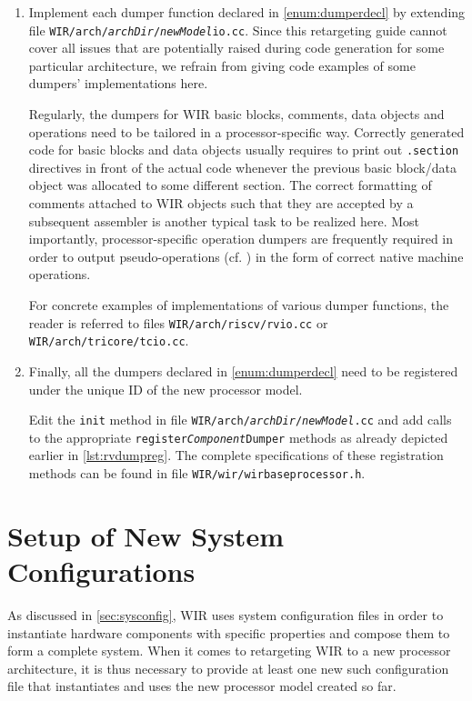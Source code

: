 \begin{enumerate}[resume]
  \item Implement each dumper function declared in \cref{enum:dumperdecl} by extending file \texttt{WIR/arch/{\itshape archDir}/{\itshape newModel}\-io.cc}.
  Since this retargeting guide cannot cover all issues that are potentially raised during code generation for some particular architecture, we refrain from giving code examples of some dumpers' implementations here.

  Regularly, the dumpers for \gls{WIR} basic blocks, comments, data objects and operations need to be tailored in a processor-specific way.
  Correctly generated code for basic blocks and data objects usually requires to print out \texttt{.section} directives in front of the actual code whenever the previous basic block/data object was allocated to some different section.
  The correct formatting of comments attached to \gls{WIR} objects such that they are accepted by a subsequent assembler is another typical task to be realized here.
  Most importantly, processor-specific operation dumpers are frequently required in order to output pseudo-operations (cf. ) in the form of correct native machine operations.

  For concrete examples of implementations of various dumper functions, the reader is referred to files \texttt{WIR/arch/riscv/rvio.cc} or \texttt{WIR/arch/tricore/tcio.cc}.

  \item Finally, all the dumpers declared in \cref{enum:dumperdecl} need to be registered under the unique ID of the new processor model.

  Edit the \texttt{init} method in file \texttt{WIR/arch/{\itshape archDir}/{\itshape newModel}.cc} and add calls to the appropriate \texttt{regis\-ter{\itshape Component}Dumper} methods as already depicted earlier in \cref{lst:rvdumpreg}.
  The complete specifications of these registration methods can be found in file \texttt{WIR/wir/wirbaseprocessor.h}.
\end{enumerate}


\section{Setup of New System Configurations}
\label{sec:newsys}

As discussed in \cref{sec:sysconfig}, \gls{WIR} uses system configuration files in order to instantiate hardware components with specific properties and compose them to form a complete system.
When it comes to retargeting \gls{WIR} to a new processor architecture, it is thus necessary to provide at least one new such configuration file that instantiates and uses the new processor model created so far.

